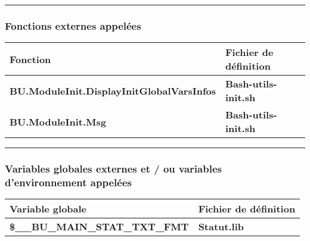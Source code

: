 \documentclass[a4paper,10pt]{article}
\begin{document}
    \setlength{\parskip}{2em}



    \color{sec3}\par\noindent\rule{\textwidth}{0.4pt}\color{text}\setlength{\parskip}{1em}

    \color{sec3}
    \subsubsection{Fonctions externes appelées}\color{text}

    \begin{justify}
        \begin{tabular}{|l|l|}
            \hline
            \textbf{Fonction} & \textbf{Fichier de définition}\\
            \hline
            \textbf{\color{func}BU.ModuleInit.DisplayInitGlobalVarsInfos} & \textbf{\color{path}Bash-utils-init.sh}\\
            \hline
            \textbf{\color{func}BU.ModuleInit.Msg}                        & \textbf{\color{path}Bash-utils-init.sh}\\
            \hline
        \end{tabular}
    \end{justify}

    \setlength{\parskip}{2em}



    \color{sec3}\par\noindent\rule{\textwidth}{0.4pt}\color{text}\setlength{\parskip}{1em}

    \color{sec3}
    \subsubsection{Variables globales externes et / ou variables d'environnement appelées}\color{text}

    \begin{justify}
        \begin{tabular}{|l|l|}
            \hline
            \textbf{Variable globale} & \textbf{Fichier de définition}\\
            \hline
            \textbf{\color{vars}\$\_\_BU\_MAIN\_STAT\_TXT\_FMT} & \textbf{\color{path}Statut.lib}\\
            \hline
        \end{tabular}
    \end{justify}
\end{document}
